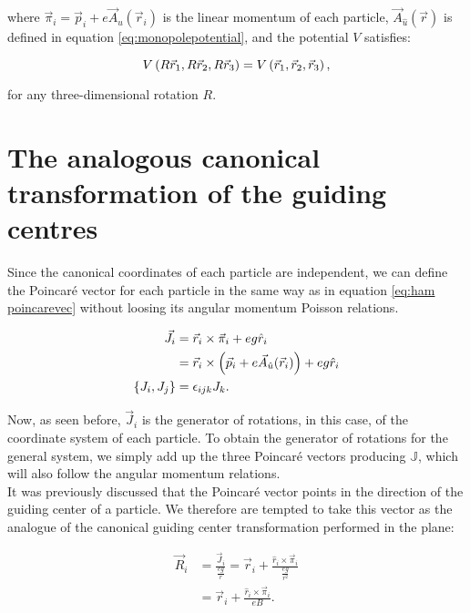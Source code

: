 where $\vec{\pi}_i = \vec{p}_i+e\vec{A}_{\hat{u}}(\vec{r}_i)$ is the linear momentum of each particle,  $\vec{A}_{\hat{u}}(\vec{r})$ is defined in equation \eqref{eq:monopolepotential}, and the potential $V$ satisfies:

\begin{equation*}
 V\left( R\vec{r}_1,R\vec{r}_2,R\vec{r}_3 \right) =  V\left( \vec{r}_1,\vec{r}_2,\vec{r}_3 \right),
\end{equation*}

for any three-dimensional rotation $R$.\\

\section{The analogous canonical transformation of the guiding centres}
Since the canonical coordinates of each particle are independent, we can define the Poincar\'e vector for each particle in the same way as in equation \eqref{eq:ham poincarevec} without loosing its angular momentum Poisson relations.

\begin{align*}
\vec{J}_i &= \vec{r}_i\times\vec{\pi}_i + eg\hat{r}_i\\
&= \vec{r}_i\times\left( \vec{p}_i+e\vec{A}_{\hat{u}}(\vec{r}_i) \right) + eg\hat{r}_i\\
\left\lbrace J_i, J_j \right\rbrace &= \epsilon_{ijk}J_k.
\end{align*}

Now, as seen before, $\vec{J}_i$ is the generator of rotations, in this case, of the coordinate system of each particle. To obtain the generator of rotations for the general system, we simply add up the three Poincar\'e vectors producing $\mathbb{J}$, which will also follow the angular momentum relations.\\

It was previously discussed that the Poincar\'e vector points in the direction of the guiding center of a particle. We therefore are tempted to take this vector as the analogue of the canonical guiding center transformation performed in the plane:

\begin{align}
\vec{R}_i &= \frac{\vec{J}_i}{\frac{eg}{r}} = \vec{r}_i + \frac{\hat{r}_i\times\vec{\pi}_i}{\frac{eg}{r^2}} \nonumber\\
&= \vec{r}_i + \frac{\hat{r}_i\times\vec{\pi}_i}{eB}.
\label{eq:gcSphere}
\end{align}

